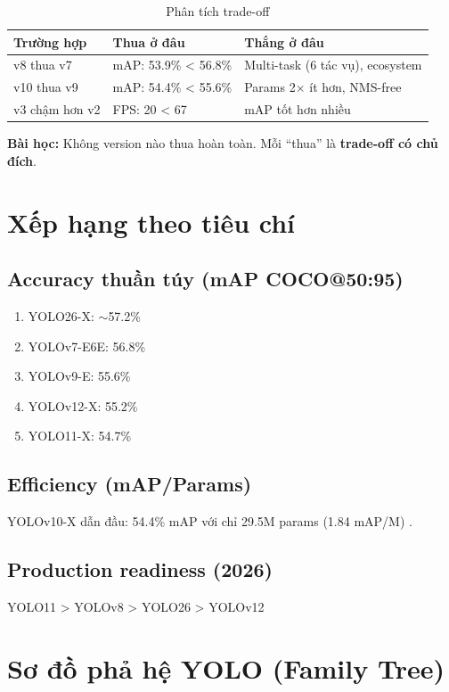 \begin{table}[H]\centering
\caption{Phân tích trade-off}
\begin{tabular}{lll}\toprule
\textbf{Trường hợp} & \textbf{Thua ở đâu} & \textbf{Thắng ở đâu}\\\midrule
v8 thua v7 \cite{yolov7}\cite{yolov8} & mAP: 53.9\% < 56.8\% & Multi-task (6 tác vụ), ecosystem \\
v10 thua v9 \cite{yolov9}\cite{yolov10} & mAP: 54.4\% < 55.6\% & Params 2$\times$ ít hơn, NMS-free \\
v3 chậm hơn v2 \cite{yolov2}\cite{yolov3} & FPS: 20 < 67 & mAP tốt hơn nhiều \\\bottomrule
\end{tabular}
\end{table}

\textbf{Bài học:} Không version nào thua hoàn toàn. Mỗi ``thua'' là \textbf{trade-off có chủ đích}.

\section{Xếp hạng theo tiêu chí}

\subsection{Accuracy thuần túy (mAP COCO@50:95)}
\begin{enumerate}
    \item YOLO26-X: $\sim$57.2\% \cite{yolo26}
    \item YOLOv7-E6E: 56.8\% \cite{yolov7}
    \item YOLOv9-E: 55.6\% \cite{yolov9}
    \item YOLOv12-X: 55.2\% \cite{yolov12}
    \item YOLO11-X: 54.7\% \cite{yolo11}
\end{enumerate}

\subsection{Efficiency (mAP/Params)}
YOLOv10-X dẫn đầu: 54.4\% mAP với chỉ 29.5M params (1.84 mAP/M) \cite{yolov10}.

\subsection{Production readiness (2026)}
YOLO11 > YOLOv8 > YOLO26 > YOLOv12

\section{Sơ đồ phả hệ YOLO (Family Tree)}

